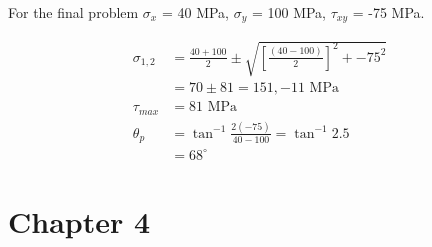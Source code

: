 \documentclass[
10pt,
a4paper,
openany,
svgnames,
]{book}
\begin{document}
\begin{exercises}
  For the final problem  $\sigma_x$ = 40 MPa, $\sigma_y$ = 100 MPa, $\tau_{xy}$ = -75 MPa.
  
  \begin{align*}
    \sigma_{1,2} &= \frac{40 + 100}{2} \pm \sqrt{ \left[ \frac{(40 - 100)}{2}\right]^2 + -75^2} \\
                 &= 70 \pm 81 = 151, -11 \text{ MPa} \\
    \tau_{max} &= 81 \text{ MPa} \\
    \theta_p &= \tan^{-1} \frac{2(-75)}{40-100} = \tan^{-1} 2.5 \\
                 &= 68^{\circ}
  \end{align*}
\end{exercises}

\section{Chapter 4}
\end{document}
